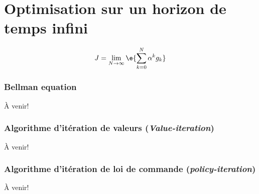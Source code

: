 \chapter{Optimisation sur un horizon de temps infini}

\begin{align}
    J = 
    \lim_{N\rightarrow \infty}
    \e{ \sum_{k=0}^{N} 
    \alpha^k
    g_k
    }
\end{align}

\subsection{Bellman equation}

À venir!

\subsection{Algorithme d'itération de valeurs (\textit{Value-iteration})}

À venir!

\subsection{Algorithme d'itération de loi de commande (\textit{policy-iteration})}

À venir!
